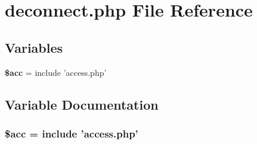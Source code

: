 \section{deconnect.php File Reference}
\label{deconnect_8php}


\subsection*{Variables}
\begin{CompactItemize}
\item 
{\bf \$acc} = include 'access.php'
\end{CompactItemize}


\subsection{Variable Documentation}
\subsubsection{\setlength{\rightskip}{0pt plus 5cm}\$acc = include 'access.php'}\label{deconnect_8php_542926c588a05eb69553d79c83cf73da}


